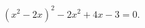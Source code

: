\begin{ex}[type=equation]
	\begin{condition}
		$(x^2 - 2x)^2 - 2x^2 + 4x - 3 = 0.$
	\end{condition}
\end{ex}